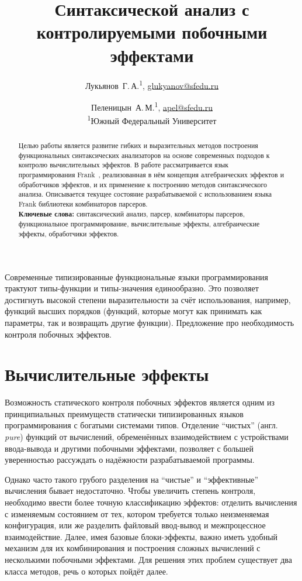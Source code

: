 \documentclass [a4paper] {article}
\title %
  {Синтаксической анализ с контролируемыми побочными эффектами}
\author %
{%
  Лукьянов~Г.\,А.\textsuperscript {1}, \url {glukyanov@sfedu.ru} \and %
  Пеленицын~А.\,М.\textsuperscript {1}, \url {apel@sfedu.ru} \\
  \textsuperscript {1}Южный Федеральный Университет
}%
\date {}    %
\begin{document}

\maketitle

\begin {abstract}
  Целью работы является развитие гибких и выразительных методов построения
  функциональных синтаксических анализаторов на основе современных подходов
  к контролю вычислительных эффектов. В работе рассматривается язык 
  программирования Frank~\cite{Frank}, реализованная в нём концепция
  алгебраических эффектов и обработчиков эффектов, и их применение к построению
  методов синтаксического анализа. Описывается текущее состояние
  разрабатываемой с использованием языка Frank библиотеки комбинаторов парсеров.
  \\ \textbf {Ключевые слова:} синтаксический анализ, парсер,
  комбинаторы парсеров, функциональное программирование, вычислительные эффекты,
  алгебраические эффекты, обработчики эффектов. 
\end {abstract}


Современные типизированные функциональные языки программирования трактуют
типы-функции и типы-значения единообразно. Это позволяет достигнуть высокой
степени выразительности за счёт использования, например, функций высших
порядков (функций, которые могут как принимать как параметры, так и
возвращать другие функции). Предложение про необходимость контроля побочных
эффектов.

\section{Вычислительные эффекты}

Возможность статического контроля побочных эффектов является одним из
принципиальных преимуществ статически типизированных языков
программирования с богатыми системами типов. Отделение ``чистых''
(англ. \emph{pure}) функций от вычислений, обременённых
взаимодействием с устройствами ввода-вывода и другими побочными
эффектами, позволяет с большей уверенностью рассуждать о надёжности
разрабатываемой программы. 

Однако часто такого грубого разделения на ``чистые'' и ``эффективные''
вычисления бывает недостаточно. Чтобы увеличить степень контроля, необходимо
ввести более точную классификацию эффектов: отделить вычисления с изменяемым
состоянием от тех, котором требуется только неизменяемая конфигурация, или же
разделить файловый ввод-вывод и межпроцессное взаимодействие. Далее, имея
базовые блоки-эффекты, важно иметь удобный механизм для их комбинирования и
построения сложных вычислений с несколькими побочными эффектами. Для решения
этих проблем существует два класса методов, речь о которых пойдёт далее.
\end{document}
